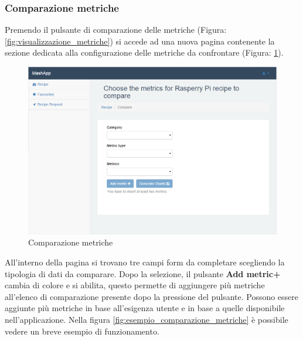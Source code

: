 		\subsubsection{Comparazione metriche} %
		\label{sec:comparazione_metriche}
			Premendo il pulsante di comparazione delle metriche\gloss{} (Figura: \ref{fig:visualizzazione_metriche}) si accede ad una nuova pagina contenente la sezione dedicata alla configurazione delle metriche\gloss{} da confrontare (Figura: \ref{fig:comparazione_metriche}).
			\begin{figure}[H]
				\centering
				\centerline{\includegraphics[width=14cm]{images/comparazione_metriche.png}}
				\caption{Comparazione metriche}
				\label{fig:comparazione_metriche}
			\end{figure}
			All'interno della pagina si trovano tre campi form\gloss{} da completare scegliendo la tipologia di dati da comparare. Dopo la selezione, il pulsante \textbf{Add metric+} cambia di colore e si abilita, questo permette di aggiungere più metriche\gloss{} all'elenco di comparazione presente dopo la pressione del pulsante.\newline
			Possono essere aggiunte più metriche\gloss{} in base all'esigenza utente e in base a quelle disponibile nell'applicazione. Nella figura \ref{fig:esempio_comparazione_metriche} è possibile vedere un breve esempio di funzionamento.
